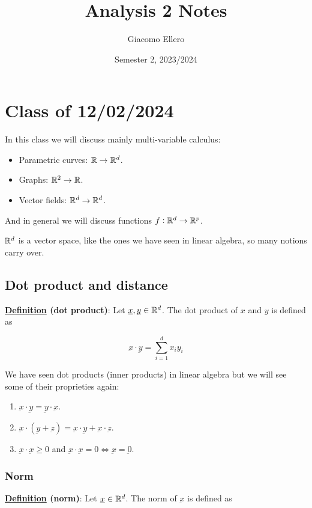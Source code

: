 \documentclass[10pt]{extarticle}
\title{Analysis 2 Notes}
\author{Giacomo Ellero}
\date{Semester 2, 2023/2024}
\renewcommand{\vec}[1]{\underbar{\ensuremath{#1}}}
\begin{document}
\maketitle
\tableofcontents
\clearpage

\section{Class of 12/02/2024}

In this class we will discuss mainly multi-variable calculus:
\begin{itemize}
    \item Parametric curves: $\mathbb{R} \to \mathbb{R}^d$.
    \item Graphs: $\mathbb{R}^2 \to \mathbb{R}$.
    \item Vector fields: $\mathbb{R}^d \to \mathbb{R}^d$.
\end{itemize}

And in general we will discuss functions $f: \mathbb{R}^d \to \mathbb{R}^p$.

$\mathbb{R}^d$ is a vector space, like the ones we have seen in linear algebra, so many notions carry over.

\subsection{Dot product and distance}

\textbf{\underline{Definition} (dot product)}: Let $\vec{x}, \vec{y} \in \R^d$. The dot product of $x$ and $y$ is defined as

$$
    \vec{x} \cdot \vec{y} = \sum_{i=1}^d x_i y_i
$$

We have seen dot products (inner products) in linear algebra but we will see some of their proprieties again:
\begin{enumerate}
    \item $\vec{x} \cdot \vec{y} = \vec{y} \cdot \vec{x}$.
    \item $\vec{x} \cdot (\vec{y} + \vec{z}) = \vec{x} \cdot \vec{y} + \vec{x} \cdot \vec{z}$.
    \item $\vec{x} \cdot \vec{x} \geq 0$ and $\vec{x} \cdot \vec{x} = 0 \iff \vec{x} = \vec{0}$.
\end{enumerate}

\subsubsection{Norm}

\textbf{\underline{Definition} (norm)}: Let $\vec{x} \in \R^d$. The norm of $\vec{x}$ is defined as
\end{document}
